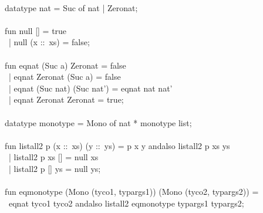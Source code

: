 \begin{isabellebody}
\begin{isamarkuptext}
\hspace*{0pt}\\
\hspace*{0pt}datatype nat = Suc of nat | Zero{}nat;\\
\hspace*{0pt}\\
\hspace*{0pt}fun null [] = true\\
\hspace*{0pt} ~| null (x ::~xs) = false;\\
\hspace*{0pt}\\
\hspace*{0pt}fun eq{}nat (Suc a) Zero{}nat = false\\
\hspace*{0pt} ~| eq{}nat Zero{}nat (Suc a) = false\\
\hspace*{0pt} ~| eq{}nat (Suc nat) (Suc nat') = eq{}nat nat nat'\\
\hspace*{0pt} ~| eq{}nat Zero{}nat Zero{}nat = true;\\
\hspace*{0pt}\\
\hspace*{0pt}datatype monotype = Mono of nat * monotype list;\\
\hspace*{0pt}\\
\hspace*{0pt}fun list{}all2 p (x ::~xs) (y ::~ys) = p x y andalso list{}all2 p xs ys\\
\hspace*{0pt} ~| list{}all2 p xs [] = null xs\\
\hspace*{0pt} ~| list{}all2 p [] ys = null ys;\\
\hspace*{0pt}\\
\hspace*{0pt}fun eq{}monotype (Mono (tyco1, typargs1)) (Mono (tyco2, typargs2)) =\\
\hspace*{0pt} ~eq{}nat tyco1 tyco2 andalso list{}all2 eq{}monotype typargs1 typargs2;\\
\hspace*{0pt}\\

\end{isamarkuptext}
\end{isabellebody}
